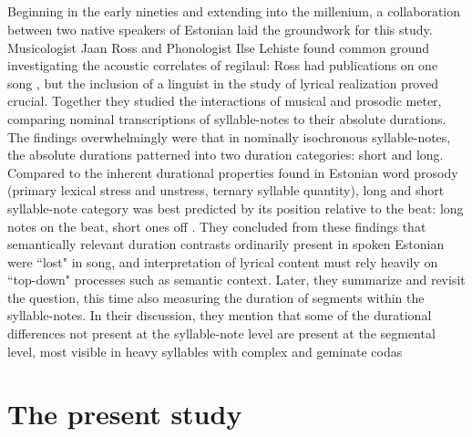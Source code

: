 %

\subsection{}


Beginning in the early nineties and extending into the millenium, a collaboration between two native speakers of Estonian laid the groundwork for this study. Musicologist Jaan Ross and Phonologist Ilse Lehiste found common ground investigating the acoustic correlates of regilaul: Ross had publications on one song \cite{ross1989, ross1992}, but the inclusion of a linguist in the study of lyrical realization proved crucial. Together they studied the interactions of musical and prosodic meter, comparing nominal transcriptions of syllable-notes to their absolute durations. The findings overwhelmingly were that in nominally isochronous syllable-notes, the absolute durations patterned into two duration categories: short and long. Compared to the inherent durational properties found in Estonian word prosody (primary lexical stress and unstress, ternary syllable quantity), long and short syllable-note category was best predicted by its position relative to the beat: long notes on the beat, short ones off \citep{rossLehiste1994, rossLehiste1996,rossLehiste1998}. They concluded from these findings that semantically relevant duration contrasts ordinarily present in spoken Estonian were ``lost" in song, and interpretation of lyrical content must rely heavily on ``top-down" processes such as semantic context. Later, they summarize and revisit the question, this time also measuring the duration of segments within the syllable-notes.  In their discussion, they mention that some of the durational differences not present at the syllable-note level are present at the segmental level, most visible in heavy syllables with complex and geminate codas \citep{rossLehiste2001}


\section{The present study}


